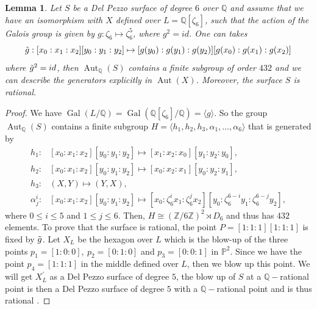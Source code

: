 \documentclass[leqno,12pt]{amsart} %
\newtheorem{lem}[thm]{Lemma}
\newcommand{\Z}{\ensuremath{\mathbb{Z}}}
\newcommand{\Q}{\ensuremath{\mathbb{Q} }}
\newcommand{\p}{\ensuremath{\mathbb{P} }}
\DeclareMathOperator{\Aut}{Aut}
\DeclareMathOperator{\Gal}{Gal}
\begin{document}
\begin{lem}\label{lemm-17}
Let $S$ be a Del Pezzo surface of degree $6$ over $\Q $ and assume that we have an isomorphism with $X$ defined over $L=\Q [\zeta_6]$, such that the action of the Galois group is given by $g:\zeta_6\mapsto \zeta_6^5$, where $g^2=id$. One can takes  \begin{equation*}
           \Tilde{g}:[x_0:x_1:x_2][y_0:y_1:y_2]\mapsto [g(y_0):g(y_1):g(y_2)][g(x_0):g(x_1):g(x_2)]
\end{equation*}
where $\Tilde{g}^2=id$, then $\Aut_{\Q }(S)$ contains a finite subgroup of order $432$ and we can describe the generators explicitly in $\Aut(X)$. Moreover, the surface $S$ is rational.
\end{lem} 
\begin{proof}
    We have $\Gal(L/\Q )=\Gal(\Q [\zeta_6]/\Q )=\langle g\rangle $. So the group $\Aut_{\Q}(S)$ contains a finite subgroup $H=\langle  h_1,h_2,h_3,\alpha_1,\ldots,\alpha_6\rangle $ that is generated by
\begin{align*}
    h_1:&[x_0:x_1:x_2][y_0:y_1:y_2]\mapsto [x_1:x_2:x_0][y_1:y_2:y_0], \\
     h_2:&[x_0:x_1:x_2][y_0:y_1:y_2]\mapsto [x_0:x_2:x_1][y_0:y_2:y_1], \\
      h_3:&(X,Y)\mapsto (Y,X), \\
    \alpha^{i}_{j}:&[x_0:x_1:x_2][y_0:y_1:y_2]\mapsto [x_0:\zeta_6^{i}x_1:\zeta_6^{j}x_2][y_0:\zeta_6^{6-i} y_1:\zeta_6^{6-j} y_2],
\end{align*}
where $0\le  i\le  5$ and $1\le  j\le  6$. Then, $H\cong(\Z/6\Z)^2\rtimes D_6$ and thus has $432$ elements. To prove that the surface is rational, the point $P=[1:1:1][1:1:1]$ is fixed by $\Tilde{g}$. Let $X_L$ be the hexagon over $L$ which is the blow-up of the three points $p_1=[1:0:0],~p_2=[0:1:0]$ and $p_3=[0:0:1]$ in $\p^2$. Since we have the point $p_4=[1:1:1]$ in the middle defined over $L$, then we blow up this point. We will get $X^{\prime}_L$ as a Del Pezzo surface of degree $5$, the blow up of $S$ at a $\Q-$rational point is then a Del Pezzo surface of degree $5$ with a $\Q-$rational point and is thus rational \cite[Theorem 3.15]{MR225780}.
\end{proof}
\end{document}
